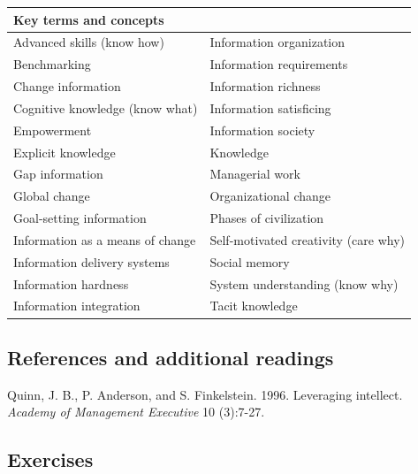 \documentclass[
]{article}
\begin{document}
\begin{longtable}[]{@{}ll@{}}
\toprule
Key terms and concepts & \\
\midrule
\endhead
Advanced skills (know how) & Information organization \\
Benchmarking & Information requirements \\
Change information & Information richness \\
Cognitive knowledge (know what) & Information satisficing \\
Empowerment & Information society \\
Explicit knowledge & Knowledge \\
Gap information & Managerial work \\
Global change & Organizational change \\
Goal-setting information & Phases of civilization \\
Information as a means of change & Self-motivated creativity (care why) \\
Information delivery systems & Social memory \\
Information hardness & System understanding (know why) \\
Information integration & Tacit knowledge \\
\bottomrule
\end{longtable}

\hypertarget{references-and-additional-readings-1}{%
\subsection*{References and additional readings}\label{references-and-additional-readings-1}}

Quinn, J. B., P. Anderson, and S. Finkelstein. 1996. Leveraging
intellect. \emph{Academy of Management Executive} 10 (3):7-27.

\hypertarget{exercises-1}{%
\subsection*{Exercises}\label{exercises-1}}
\end{document}
